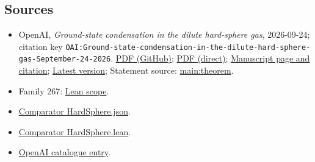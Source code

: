 \documentclass[11pt]{article}
\begin{document}
\subsection{Sources}
\begin{itemize}
\item OpenAI, \emph{Ground-state condensation in the dilute hard-sphere gas}, 2026-09-24; citation key \texttt{OAI:Ground-state-condensation-in-the-dilute-hard-sphere-gas-September-24-2026}. \href{https://github.com/openai/math/blob/adc7f1241b42e322a6451854ab7e4b4c146bf78a/preprints/Ground-state-condensation-in-the-dilute-hard-sphere-gas-September-24-2026/paper.pdf}{PDF (GitHub)}; \href{https://github.com/openai/math/raw/adc7f1241b42e322a6451854ab7e4b4c146bf78a/preprints/Ground-state-condensation-in-the-dilute-hard-sphere-gas-September-24-2026/paper.pdf}{PDF (direct)}; \href{https://github.com/openai/math/blob/adc7f1241b42e322a6451854ab7e4b4c146bf78a/preprints/Ground-state-condensation-in-the-dilute-hard-sphere-gas-September-24-2026/README.md}{Manuscript page and citation}; \href{https://github.com/openai/math/blob/main/preprints/Ground-state-condensation-in-the-dilute-hard-sphere-gas-September-24-2026/paper.pdf}{Latest version}; Statement source: \href{https://github.com/openai/math/blob/adc7f1241b42e322a6451854ab7e4b4c146bf78a/preprints/Ground-state-condensation-in-the-dilute-hard-sphere-gas-September-24-2026/build/sections/introduction.tex\#L48}{main:theorem}.
\item Family 267: \href{https://github.com/openai/math/blob/adc7f1241b42e322a6451854ab7e4b4c146bf78a/lean/docs/267.md}{Lean scope}.
\item \href{https://github.com/openai/math/blob/adc7f1241b42e322a6451854ab7e4b4c146bf78a/lean/ComparatorChallenges/HardSphere.json}{Comparator HardSphere.json}.
\item \href{https://github.com/openai/math/blob/adc7f1241b42e322a6451854ab7e4b4c146bf78a/lean/ComparatorChallenges/HardSphere.lean}{Comparator HardSphere.lean}.
\item \href{https://github.com/openai/math/blob/adc7f1241b42e322a6451854ab7e4b4c146bf78a/CONTENTS.md}{OpenAI catalogue entry}.
\end{itemize}
\end{document}
